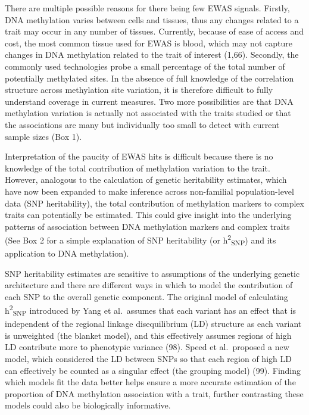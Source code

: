 \documentclass[11pt,oneside]{bristolthesis}
\begin{document}
There are multiple possible reasons for there being few EWAS signals. Firstly, DNA methylation varies between cells and tissues, thus any changes related to a trait may occur in any number of tissues. Currently, because of ease of access and cost, the most common tissue used for EWAS is blood, which may not capture changes in DNA methylation related to the trait of interest (1,66). Secondly, the commonly used technologies probe a small percentage of the total number of potentially methylated sites. In the absence of full knowledge of the correlation structure across methylation site variation, it is therefore difficult to fully understand coverage in current measures. Two more possibilities are that DNA methylation variation is actually not associated with the traits studied or that the associations are many but individually too small to detect with current sample sizes (Box 1).

Interpretation of the paucity of EWAS hits is difficult because there is no knowledge of the total contribution of methylation variation to the trait. However, analogous to the calculation of genetic heritability estimates, which have now been expanded to make inference across non-familial population-level data (SNP heritability), the total contribution of methylation markers to complex traits can potentially be estimated. This could give insight into the underlying patterns of association between DNA methylation markers and complex traits (See Box 2 for a simple explanation of SNP heritability (or h\textsuperscript{2}\textsubscript{SNP}) and its application to DNA methylation).

SNP heritability estimates are sensitive to assumptions of the underlying genetic architecture and there are different ways in which to model the contribution of each SNP to the overall genetic component. The original model of calculating h\textsuperscript{2}\textsubscript{SNP} introduced by Yang et al.~assumes that each variant has an effect that is independent of the regional linkage disequilibrium (LD) structure as each variant is unweighted (the blanket model), and this effectively assumes regions of high LD contribute more to phenotypic variance (98). Speed et al.~proposed a new model, which considered the LD between SNPs so that each region of high LD can effectively be counted as a singular effect (the grouping model) (99). Finding which models fit the data better helps ensure a more accurate estimation of the proportion of DNA methylation association with a trait, further contrasting these models could also be biologically informative.
\end{document}
